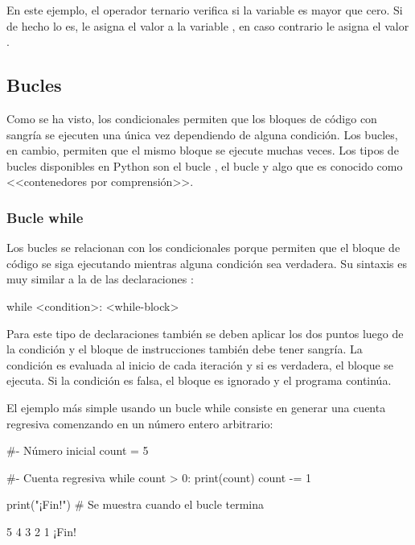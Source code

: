 En este ejemplo, el operador ternario verifica si la variable  es mayor que cero. Si de hecho lo es, le asigna el valor  a la variable , en caso contrario le asigna el valor . 

\subsection{Bucles}
Como se ha visto, los condicionales permiten que los bloques de código con sangría se ejecuten una única vez dependiendo de alguna condición. Los bucles, en cambio, permiten que el mismo bloque se ejecute muchas veces. Los tipos de bucles disponibles en Python son el bucle , el bucle  y algo que es conocido como <<contenedores por comprensión>>. 

\subsubsection{Bucle while}
Los bucles  se relacionan con los condicionales porque permiten que el bloque de código se siga ejecutando mientras alguna condición sea verdadera. Su sintaxis es muy similar a la de las declaraciones :

\begin{shell}
while <condition>:
    <while-block>
\end{shell}

Para este tipo de declaraciones también se deben aplicar los dos puntos luego de la condición y el bloque de instrucciones también debe tener sangría. La condición es evaluada al inicio de cada iteración y si es verdadera, el bloque se ejecuta. Si la condición es falsa, el bloque es ignorado y el programa continúa. 

El ejemplo más simple usando un bucle while consiste en generar una cuenta regresiva comenzando en un número entero arbitrario:

\begin{pyin}[]
#- Número inicial
count = 5

#- Cuenta regresiva
while count > 0:
    print(count)
    count -= 1

print("¡Fin!")  # Se muestra cuando el bucle termina
\end{pyin}
\begin{pyprint}
5
4
3
2
1
¡Fin!
\end{pyprint}

